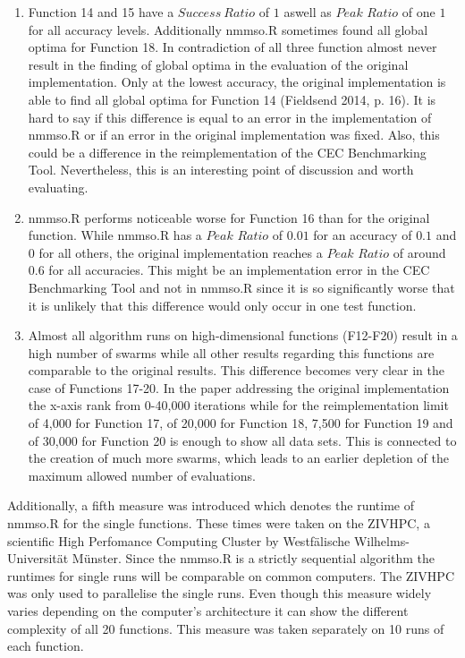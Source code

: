 \documentclass[12pt,a4paper]{article}
\begin{document}
\begin{enumerate}
\def\labelenumi{(\arabic{enumi})}
\item
  Function 14 and 15 have a \(Success\ Ratio\) of \(1\) aswell as
  \(Peak\) \(Ratio\) of one \(1\) for all accuracy levels. Additionally
  nmmso.R sometimes found all global optima for Function 18. In
  contradiction of all three function almost never result in the finding
  of global optima in the evaluation of the original implementation.
  Only at the lowest accuracy, the original implementation is able to
  find all global optima for Function 14 (Fieldsend 2014, p. 16). It is
  hard to say if this difference is equal to an error in the
  implementation of nmmso.R or if an error in the original
  implementation was fixed. Also, this could be a difference in the
  reimplementation of the CEC Benchmarking Tool. Nevertheless, this is
  an interesting point of discussion and worth evaluating.
\item
  nmmso.R performs noticeable worse for Function 16 than for the
  original function. While nmmso.R has a \(Peak\) \(Ratio\) of \(0.01\)
  for an accuracy of \(0.1\) and \(0\) for all others, the original
  implementation reaches a \(Peak\) \(Ratio\) of around \(0.6\) for all
  accuracies. This might be an implementation error in the CEC
  Benchmarking Tool and not in nmmso.R since it is so significantly
  worse that it is unlikely that this difference would only occur in one
  test function.
\item
  Almost all algorithm runs on high-dimensional functions (F12-F20)
  result in a high number of swarms while all other results regarding
  this functions are comparable to the original results. This difference
  becomes very clear in the case of Functions 17-20. In the paper
  addressing the original implementation the x-axis rank from 0-40,000
  iterations while for the reimplementation limit of 4,000 for Function
  17, of 20,000 for Function 18, 7,500 for Function 19 and of 30,000 for
  Function 20 is enough to show all data sets. This is connected to the
  creation of much more swarms, which leads to an earlier depletion of
  the maximum allowed number of evaluations.
\end{enumerate}

Additionally, a fifth measure was introduced which denotes the runtime
of nmmso.R for the single functions. These times were taken on the
ZIVHPC, a scientific High Perfomance Computing Cluster by Westfälische
Wilhelms-Universität Münster. Since the nmmso.R is a strictly sequential
algorithm the runtimes for single runs will be comparable on common
computers. The ZIVHPC was only used to parallelise the single runs. Even
though this measure widely varies depending on the computer's
architecture it can show the different complexity of all 20 functions.
This measure was taken separately on 10 runs of each function.
\end{document}
